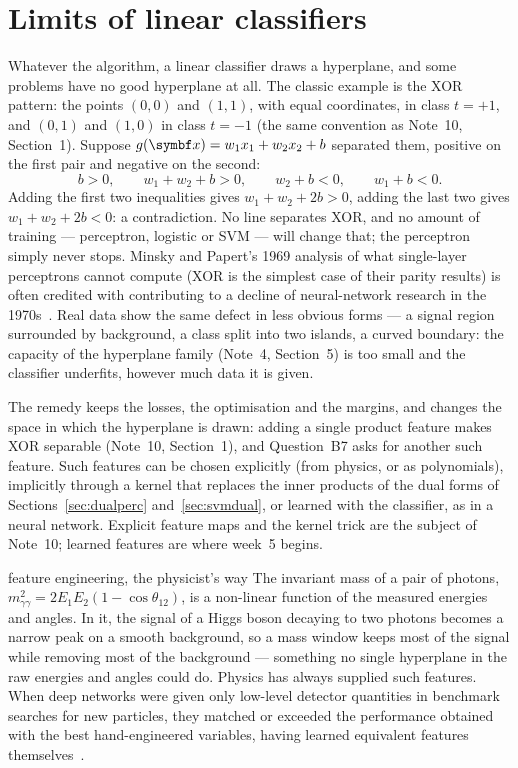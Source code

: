 \documentclass[11pt]{article}
\begin{document}
\section{Limits of linear classifiers}\label{sec:features}\label{sec:limits}

Whatever the algorithm, a linear classifier draws a hyperplane, and some problems have no good hyperplane at all. The
classic example is the XOR pattern: the points $(0, 0)$ and $(1, 1)$, with equal coordinates, in class $t = +1$, and
$(0, 1)$ and $(1, 0)$ in class $t = -1$ (the same convention as Note~10, Section~1). Suppose
$g(\x) = w_1x_1 + w_2x_2 + b$ separated them, positive on the first pair and negative on the second:
\[
  b > 0, \qquad w_1 + w_2 + b > 0, \qquad w_2 + b < 0, \qquad w_1 + b < 0 .
\]
Adding the first two inequalities gives $w_1 + w_2 + 2b > 0$, adding the last two gives $w_1 + w_2 + 2b < 0$: a
contradiction. No line separates XOR, and no amount of training --- perceptron, logistic or SVM --- will change that; the
perceptron simply never stops. Minsky and Papert's 1969 analysis of what single-layer perceptrons cannot compute (XOR is
the simplest case of their parity results) is often credited with contributing to a decline of neural-network research
in the 1970s~\cite{minsky1969}. Real data show the same defect in less obvious forms --- a signal region surrounded by
background, a class split into two islands, a curved boundary: the capacity of the hyperplane family (Note~4, Section~5)
is too small and the classifier underfits, however much data it is given.

The remedy keeps the losses, the optimisation and the margins, and changes the space in which the hyperplane is drawn:
adding a single product feature makes XOR separable (Note~10, Section~1), and Question~B7 asks for another such
feature. Such features can be chosen
explicitly (from physics, or as polynomials), implicitly through a kernel that replaces the inner products of the dual
forms of Sections~\ref{sec:dualperc} and~\ref{sec:svmdual}, or learned with the classifier, as in a neural network.
Explicit feature maps and the kernel trick are the subject of Note~10; learned features are where week~5 begins.

\begin{physics}{feature engineering, the physicist's way}
The invariant mass of a pair of photons, $m_{\gamma\gamma}^2 = 2E_1E_2(1 - \cos\theta_{12})$, is a non-linear function of
the measured energies and angles. In it, the signal of a Higgs boson decaying to two photons becomes a narrow peak on a
smooth background, so a mass window keeps most of the signal while removing most of the background --- something no single
hyperplane in the raw energies and angles could do. Physics has always supplied such
features. When deep networks were given only low-level detector quantities in benchmark searches for new particles, they
matched or exceeded the performance obtained with the best hand-engineered variables, having learned equivalent features
themselves~\cite{baldi2014}.
\end{physics}
\end{document}
